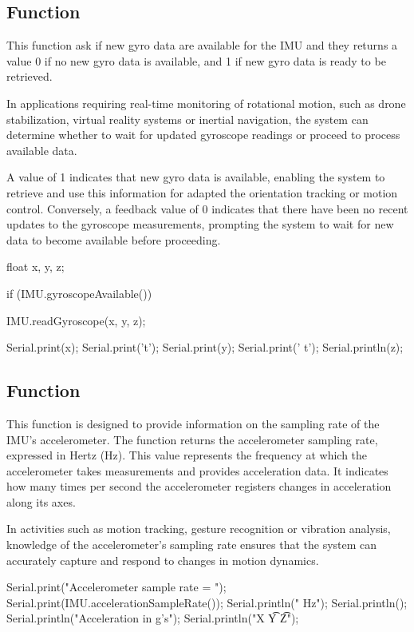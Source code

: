 \subsection{Function }

This function ask if new gyro data are available for the IMU and they returns a value 0 if no new gyro data is available, and 1 if new gyro data is ready to be retrieved.

In applications requiring real-time monitoring of rotational motion, such as drone stabilization, virtual reality systems or inertial navigation, the system can determine whether to wait for updated gyroscope readings or proceed to process available data.

A value of 1 indicates that new gyro data is available, enabling the system to retrieve and use this information for adapted the orientation tracking or motion control. Conversely, a feedback value of 0 indicates that there have been no recent updates to the gyroscope measurements, prompting the system to wait for new data to become available before proceeding.

\begin{Arduino}
	float x, y, z;
	
	if (IMU.gyroscopeAvailable()) {
		IMU.readGyroscope(x, y, z);
		
		Serial.print(x);
		Serial.print('t');
		Serial.print(y);
		Serial.print(' t');
		Serial.println(z); }
\end{Arduino}


\subsection{Function }

This function is designed to provide information on the sampling rate of the IMU's accelerometer. The function  returns the accelerometer sampling rate, expressed in Hertz (Hz). This value represents the frequency at which the accelerometer takes measurements and provides acceleration data. It indicates how many times per second the accelerometer registers changes in acceleration along its axes.

In activities such as motion tracking, gesture recognition or vibration analysis, knowledge of the accelerometer's sampling rate ensures that the system can accurately capture and respond to changes in motion dynamics. 

\begin{Arduino}
	Serial.print("Accelerometer sample rate = ");
	Serial.print(IMU.accelerationSampleRate());
	Serial.println(" Hz");
	Serial.println();
	Serial.println("Acceleration in g's");
	Serial.println("X \t Y  \t Z");
\end{Arduino}



